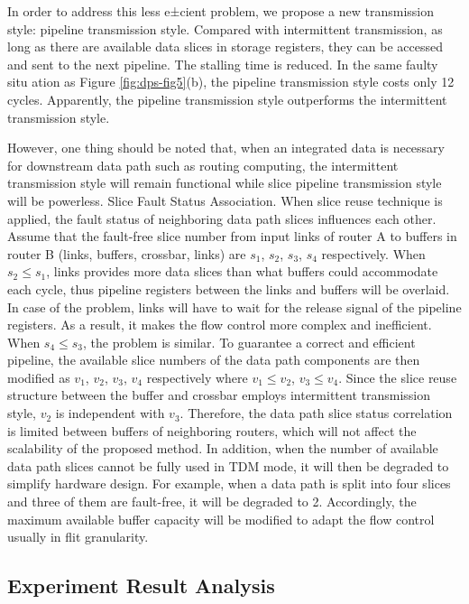 In order to address this less e±cient problem, we propose a new transmission style: pipeline transmission style. Compared with intermittent transmission, as long as there are available data slices in storage registers, they can be accessed and sent to the next pipeline. The stalling time is reduced. In the same faulty situ
ation as Figure \ref{fig:dps-fig5}(b), the pipeline transmission style costs only 12 cycles. Apparently, the pipeline transmission style outperforms the intermittent transmission style.

However, one thing should be noted that, when an integrated data is necessary for downstream data path such as routing computing, the intermittent transmission style will remain functional while slice pipeline transmission style will be powerless. Slice Fault Status Association. When slice reuse technique is applied, the fault status of neighboring data path slices influences each other. Assume that the fault-free slice number from input links of router A to buffers in router B (links, buffers, crossbar, links) are $s_1$, $s_2$, $s_3$, $s_4$ respectively. When $s_{2} \leq s_{1}$, links provides more data slices than what buffers could accommodate each cycle, thus pipeline registers between the links and buffers will be overlaid. In case of the problem, links will have to wait for the release signal of the pipeline registers. As a result, it makes the flow control more complex and inefficient. When $s_{4} \leq s_{3}$, the problem is similar. To guarantee a correct and efficient pipeline, the available slice numbers of the data path components are then modified as $v_1$, $v_2$, $v_3$, $v_4$ respectively where $v_{1} \leq v_{2}$, $v_{3} \leq v_{4}$. Since the slice reuse structure between the buffer and crossbar employs intermittent transmission style, $v_2$ is independent with $v_3$. Therefore, the data path slice status correlation is limited between buffers of neighboring routers, which will not affect the scalability of the proposed method. In addition, when the number of available data path slices cannot be fully used in TDM mode, it will then be degraded to simplify hardware design. For example, when a data path is split into four slices and three of them are fault-free, it will be degraded to 2. Accordingly, the maximum available buffer capacity will be modified to adapt the flow control usually in flit granularity.

\subsection{Experiment Result Analysis}

